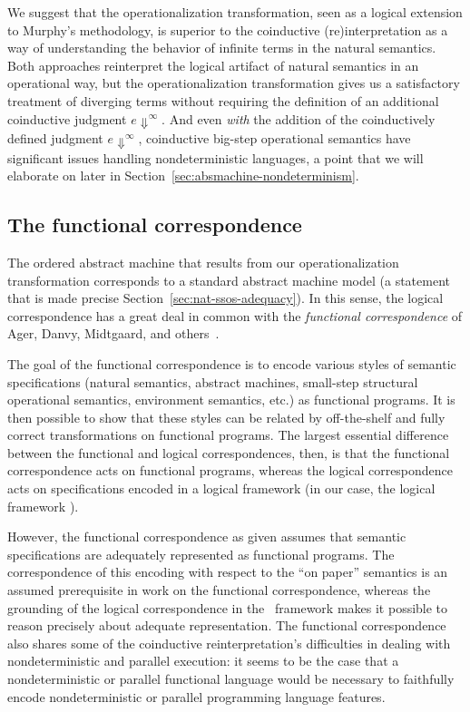 We suggest that the operationalization transformation, seen as a
logical extension to Murphy's methodology, is superior to the
coinductive (re)interpretation as a way of understanding the behavior
of infinite terms in the natural semantics. Both approaches
reinterpret the logical artifact of natural semantics in an
operational way, but the operationalization transformation gives us a
satisfactory treatment of diverging terms without requiring the
definition of an additional coinductive judgment $e
\Downarrow^\infty$. And even {\it with} the addition of the
coinductively defined judgment $e \Downarrow^\infty$, coinductive
big-step operational semantics have significant issues handling
nondeterministic languages, a point that we will elaborate on 
later in Section~\ref{sec:absmachine-nondeterminism}.

\subsection{The functional correspondence}

The ordered abstract machine that results from our operationalization
transformation corresponds to a standard abstract machine model (a
statement that is made precise
Section~\ref{sec:nat-ssos-adequacy}). In this sense, the logical
correspondence has a great deal in common with the {\it functional
  correspondence} of Ager, Danvy, Midtgaard, and
others~\cite{ager03functional,ager04functional,ager05functional,
  danvy08defunctionalized,danvy12interderiving}. 

The goal of the functional correspondence is to encode various styles
of semantic specifications (natural semantics, abstract machines,
small-step structural operational semantics, environment semantics,
etc.) as functional programs. It is then possible to show that these
styles can be related by off-the-shelf and fully correct
transformations on functional programs. The largest essential
difference between the functional and logical correspondences, then,
is that the functional correspondence acts on functional programs,
whereas the logical correspondence acts on specifications encoded in a
logical framework (in our case, the logical framework \sls).

However, the functional correspondence as given assumes that semantic
specifications are adequately represented as functional programs. The
correspondence of this encoding with respect to the ``on paper''
semantics is an assumed prerequisite in work on the functional
correspondence, whereas the grounding of the logical correspondence in
the \sls~framework makes it possible to reason precisely about
adequate representation. The functional correspondence also shares
some of the coinductive reinterpretation's difficulties in dealing
with nondeterministic and parallel execution: it seems to be the case
that a nondeterministic or parallel functional language would be
necessary to faithfully encode nondeterministic or parallel programming
language features.

